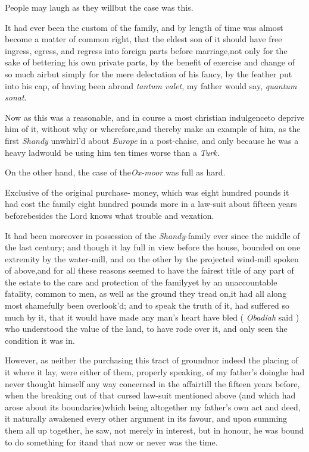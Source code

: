 \documentclass{article}
\begin{document}
\tsk People may laugh as they will\tsh but the case
was this.

It had ever been the custom of the family, and by length of time
was almost become a matter of common right, that the eldest son of
it should have free ingress, egress, and regress into foreign parts
before marriage,\tsk not only for the sake of bettering his own
private parts, by the benefit of exercise and change of so much
air\tsk but simply for the mere delectation of his fancy, by the
feather
put into his cap, of having been abroad\break
\tsk \textit{tantum valet}, my father would say,
\textit{quantum sonat}.

Now as this was a reasonable, and in course a most christian
indulgence\tsh to deprive him of it, without why or\break
wherefore,\tsh and thereby make an example of him, as the
first \textit{Shandy} unwhirl’d about \textit{Europe} in a
post-chaise, and only because he was a heavy lad\tsh would
be using him ten times worse than a \textit{Turk.}

On the other hand, the case of the\break \textit{Ox-moor} was full as
hard.

Exclusive of the original purchase-\break
money, which was eight hundred pounds\break
\tsk it had cost the family eight hundred
pounds more in a law-suit about fifteen
years before\tsk besides the Lord knows what trouble and vexation.

It had been moreover in possession of the \textit{Shandy}-family
ever since the middle of the last century; and though it lay full
in view before the house, bounded on one extremity by the
water-mill, and on the other by the projected wind-mill
spoken of above,\tsk and for all these reasons
seemed to have the fairest title of any part of the estate to the
care and protection of the family\tsk yet by an unaccountable
fatality, common to men, as well as the ground they tread
on,\tsk it had all along most shamefully been
overlook’d; and to speak the truth of it, had suffered so
much by it, that it would have made any man’s heart have bled
( \textit{Obadiah} said ) who understood the value of the land, to have
rode over it, and only seen the condition it was in.

However, as neither the purchasing this tract of
ground\tsk nor indeed the placing of it where it lay, were either
of them, properly speaking, of my father’s
doing\tsh he had never thought himself any way concerned
in the affair\tsh till the fifteen years before, when the
breaking out of that cursed law-suit mentioned above (and which had
arose about its boundaries)\tsh which being altogether my
father’s own act and deed, it naturally awakened every other
argument in its favour, and upon summing them all up
together, he saw, not merely in interest, but in honour, he was
bound to do something for it\tsh and that now or never was
the time.
\end{document}
